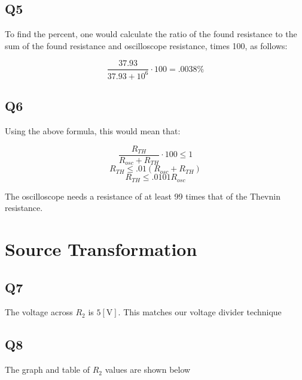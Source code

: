 \documentclass[
	letterpaper, %
	10pt, %
]{CSUniSchoolLabReport}
\begin{document}
\subsection{Q5} To find the percent, one would calculate the ratio of the found resistance to the sum of the found resistance and oscilloscope resistance, times 100, as follows:

$$\frac{37.93}{37.93+10^6}\cdot100=.0038\%$$

\subsection{Q6} Using the above formula, this would mean that:

$$\dfrac{R_{TH}}{R_{osc}+R_{TH}}\cdot 100 \leq 1$$
$$R_{TH}\leq.01(R_{osc}+R_{TH})$$
$$R_{TH}\leq .0101R_{osc}$$

The oscilloscope needs a resistance of at least 99 times that of the Thevnin resistance.

\section{Source Transformation}

\subsection{Q7} The voltage across $R_2$ is $5[\si{\volt}]$. This matches our voltage divider technique

\subsection{Q8} The graph and table of $R_2$ values are shown below

 \begin{center}
    \end{center}
\end{document}
